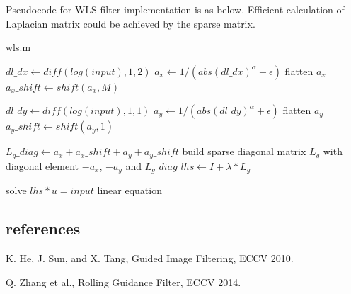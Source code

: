 \documentclass[extendedabs]{bmvc2k}
\begin{document}
Pseudocode for WLS filter implementation is as below. Efficient calculation of 
Laplacian matrix could be achieved by the sparse matrix.

\begin{algorithm}
    \caption{wls.m}
    $dl\_dx \gets diff(log(input), 1, 2)$\;
    $a_x \gets 1 / (abs(dl\_dx)^\alpha + \epsilon)$\;
    flatten $a_x$\;
    $a_x\_shift \gets shift(a_x, M)$\;

    $dl\_dy \gets diff(log(input), 1, 1)$\;
    $a_y \gets 1 / (abs(dl\_dy)^\alpha + \epsilon)$\;
    flatten $a_y$\;
    $a_y\_shift \gets shift(a_y, 1)$\;

    $L_g\_diag \gets a_x + a_x\_shift + a_y + a_y\_shift$\;
    build sparse diagonal matrix $L_g$ with diagonal element $-a_x$, $-a_y$ and $L_g\_diag$\;
    $lhs \gets I + \lambda * L_g$\;

    solve $lhs * u = input$ linear equation\;
\end{algorithm}

\subsection*{references}

\begin{thebibliography}{9}
    K. He, J. Sun, and X. Tang, Guided Image Filtering, ECCV 2010.
    
    Q. Zhang et al., Rolling Guidance Filter, ECCV 2014.
\end{thebibliography}
\end{document}
